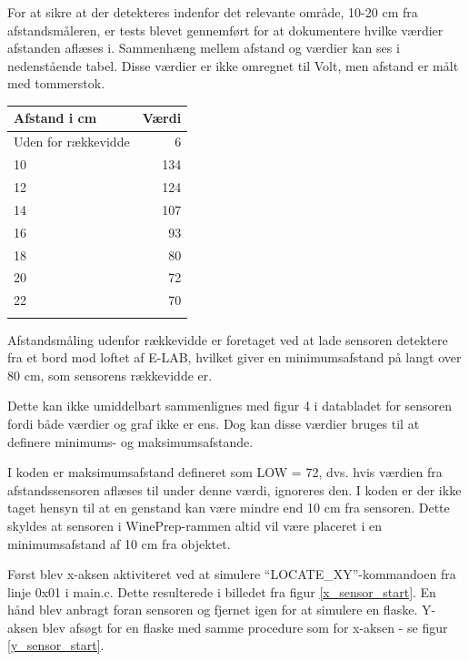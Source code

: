 For at sikre at der detekteres indenfor det relevante område, 10-20 cm fra afstandsmåleren, er tests blevet gennemført for at dokumentere hvilke værdier afstanden aflæses i. Sammenhæng mellem afstand og værdier kan ses i nedenstående tabel. Disse værdier er ikke omregnet til Volt, men afstand er målt med tommerstok.

\begin{table}[H]
\begin{tabular}{| l | r |}
\hline
Afstand i cm & Værdi\\\hline
Uden for rækkevidde & 6\\\hline
10 & 134\\\hline
12 & 124\\\hline
14 & 107\\\hline
16 & 93\\\hline
18 & 80\\\hline
20 & 72\\\hline
22 & 70\\\hline
\label{Afstand-vaerdier}
\end{tabular}
\end{table}

Afstandsmåling udenfor rækkevidde er foretaget ved at lade sensoren detektere fra et bord mod loftet af E-LAB, hvilket giver en minimumsafstand på langt over 80 cm, som sensorens rækkevidde er.

Dette kan ikke umiddelbart sammenlignes med figur 4 i databladet for sensoren fordi både værdier og graf ikke er ens. Dog kan disse værdier bruges til at definere minimums- og maksimumsafstande.

I koden er maksimumsafstand defineret som LOW = 72, dvs. hvis værdien fra afstandssensoren aflæses til under denne værdi, ignoreres den. I koden er der ikke taget hensyn til at en genstand kan være mindre end 10 cm fra sensoren. Dette skyldes at sensoren i WinePrep-rammen altid vil være placeret i en minimumsafstand af 10 cm fra objektet.

Først blev x-aksen aktiviteret ved at simulere ``LOCATE\_XY''-kommandoen fra linje 0x01 i main.c. Dette resulterede i billedet fra figur \ref{x_sensor_start}. En hånd blev anbragt foran sensoren og fjernet igen for at simulere en flaske. Y-aksen blev afsøgt for en flaske med samme procedure som for x-aksen - se figur \ref{y_sensor_start}.

